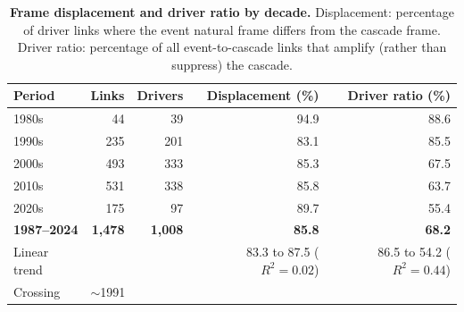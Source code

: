 \begin{table}[h]
\centering
\renewcommand{\arraystretch}{1.15}
\caption{\textbf{Frame displacement and driver ratio by decade.}
Displacement: percentage of driver links where the event natural frame
differs from the cascade frame.
Driver ratio: percentage of all event-to-cascade links that amplify
(rather than suppress) the cascade.}
\label{tab:si_displacement}
\vspace{0.3em}
\small
\begin{tabular}{@{}l r r r r@{}}
\toprule
Period & Links & Drivers & Displacement (\%) & Driver ratio (\%) \\
\midrule
1980s & 44 & 39 & 94.9 & 88.6 \\
1990s & 235 & 201 & 83.1 & 85.5 \\
2000s & 493 & 333 & 85.3 & 67.5 \\
2010s & 531 & 338 & 85.8 & 63.7 \\
2020s & 175 & 97 & 89.7 & 55.4 \\
\midrule
\textbf{1987--2024} & \textbf{1,478} & \textbf{1,008} & \textbf{85.8} & \textbf{68.2} \\
\midrule
Linear trend & & & 83.3 to 87.5 ($R^2=0.02$) & 86.5 to 54.2 ($R^2=0.44$) \\
Crossing & \multicolumn{4}{l}{$\sim$1991} \\
\bottomrule
\end{tabular}
\end{table}
